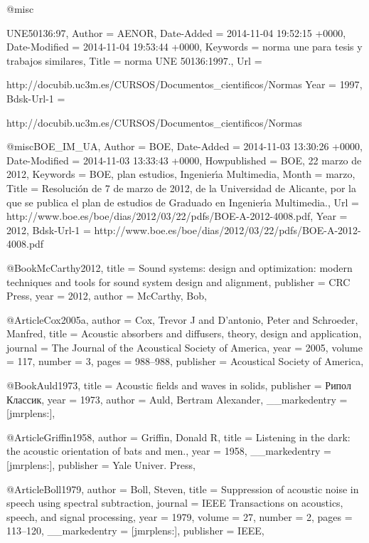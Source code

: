 @misc{UNE50136:97,
	Author = {AENOR},
	Date-Added = {2014-11-04 19:52:15 +0000},
	Date-Modified = {2014-11-04 19:53:44 +0000},
	Keywords = {norma une para tesis y trabajos similares},
	Title = {norma UNE 50136:1997.},
	Url = {http://docubib.uc3m.es/CURSOS/Documentos_cientificos/Normas%
	Year = {1997},
	Bdsk-Url-1 = {http://docubib.uc3m.es/CURSOS/Documentos_cientificos/Normas%

@misc{BOE_IM_UA,
	Author = {BOE},
	Date-Added = {2014-11-03 13:30:26 +0000},
	Date-Modified = {2014-11-03 13:33:43 +0000},
	Howpublished = {BOE, 22 marzo de 2012},
	Keywords = {BOE, plan estudios, Ingenier{\'\i}a Multimedia},
	Month = {marzo},
	Title = {Resoluci{\'o}n de 7 de marzo de 2012, de la Universidad de Alicante, por la que se publica el plan de estudios de Graduado en Ingenier{\'\i}a Multimedia.},
	Url = {http://www.boe.es/boe/dias/2012/03/22/pdfs/BOE-A-2012-4008.pdf},
	Year = {2012},
	Bdsk-Url-1 = {http://www.boe.es/boe/dias/2012/03/22/pdfs/BOE-A-2012-4008.pdf}}

@Book{McCarthy2012,
  title     = {Sound systems: design and optimization: modern techniques and tools for sound system design and alignment},
  publisher = {CRC Press},
  year      = {2012},
  author    = {McCarthy, Bob},
}

@Article{Cox2005a,
  author    = {Cox, Trevor J and D’antonio, Peter and Schroeder, Manfred},
  title     = {Acoustic absorbers and diffusers, theory, design and application},
  journal   = {The Journal of the Acoustical Society of America},
  year      = {2005},
  volume    = {117},
  number    = {3},
  pages     = {988--988},
  publisher = {Acoustical Society of America},
}

@Book{Auld1973,
  title         = {Acoustic fields and waves in solids},
  publisher     = {Рипол Классик},
  year          = {1973},
  author        = {Auld, Bertram Alexander},
  __markedentry = {[jmrplens:]},
}

@Article{Griffin1958,
  author        = {Griffin, Donald R},
  title         = {Listening in the dark: the acoustic orientation of bats and men.},
  year          = {1958},
  __markedentry = {[jmrplens:]},
  publisher     = {Yale Univer. Press},
}

@Article{Boll1979,
  author        = {Boll, Steven},
  title         = {Suppression of acoustic noise in speech using spectral subtraction},
  journal       = {IEEE Transactions on acoustics, speech, and signal processing},
  year          = {1979},
  volume        = {27},
  number        = {2},
  pages         = {113--120},
  __markedentry = {[jmrplens:]},
  publisher     = {IEEE},
}

}}}
